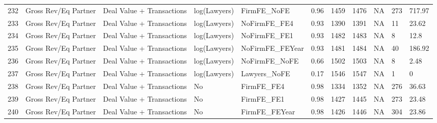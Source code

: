 \begin{table}[ht]
\begin{tabular}{rllllllllll}
  232 & Gross Rev/Eq Partner & Deal Value + Transactions & log(Lawyers) & FirmFE\_NoFE & 0.96 & 1459 & 1476 & NA & 273 & 717.97 \\ 
  233 & Gross Rev/Eq Partner & Deal Value + Transactions & log(Lawyers) & NoFirmFE\_FE4 & 0.93 & 1390 & 1391 & NA & 11 & 23.62 \\ 
  234 & Gross Rev/Eq Partner & Deal Value + Transactions & log(Lawyers) & NoFirmFE\_FE1 & 0.93 & 1482 & 1483 & NA & 8 & 12.8 \\ 
  235 & Gross Rev/Eq Partner & Deal Value + Transactions & log(Lawyers) & NoFirmFE\_FEYear & 0.93 & 1481 & 1484 & NA & 40 & 186.92 \\ 
  236 & Gross Rev/Eq Partner & Deal Value + Transactions & log(Lawyers) & NoFirmFE\_NoFE & 0.66 & 1502 & 1503 & NA & 8 & 2.48 \\ 
  237 & Gross Rev/Eq Partner & Deal Value + Transactions & log(Lawyers) & Lawyers\_NoFE & 0.17 & 1546 & 1547 & NA & 1 & 0 \\ 
  238 & Gross Rev/Eq Partner & Deal Value + Transactions & No & FirmFE\_FE4 & 0.98 & 1334 & 1352 & NA & 276 & 36.63 \\ 
  239 & Gross Rev/Eq Partner & Deal Value + Transactions & No & FirmFE\_FE1 & 0.98 & 1427 & 1445 & NA & 273 & 23.48 \\ 
  240 & Gross Rev/Eq Partner & Deal Value + Transactions & No & FirmFE\_FEYear & 0.98 & 1426 & 1446 & NA & 304 & 23.86 \\ 
   \hline
\end{tabular}
\end{table}
